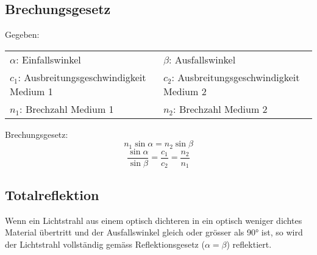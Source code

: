 \subsection{Brechungsgesetz}

Gegeben:

\begin{tabular}{ll}
	$\alpha$: Einfallswinkel & $\beta$: Ausfallswinkel \\
	$c_1$: Ausbreitungsgeschwindigkeit Medium 1 & $c_2$: Ausbreitungsgeschwindigkeit Medium 2 \\
	$n_1$: Brechzahl Medium 1 & $n_2$: Brechzahl Medium 2
\end{tabular}

Brechungsgesetz:
\[
	n_1 \sin \alpha = n_2 \sin \beta
\]
\[
	\frac{\sin \alpha}{\sin \beta} = \frac{c_1}{c_2} = \frac{n_2}{n_1}
\]

\subsection{Totalreflektion}

Wenn ein Lichtstrahl aus einem optisch dichteren in ein optisch weniger dichtes
Material übertritt und der Ausfallswinkel gleich oder grösser als 90° ist, so
wird der Lichtstrahl vollständig gemäss Reflektionsgesetz ($\alpha = \beta$)
reflektiert.
